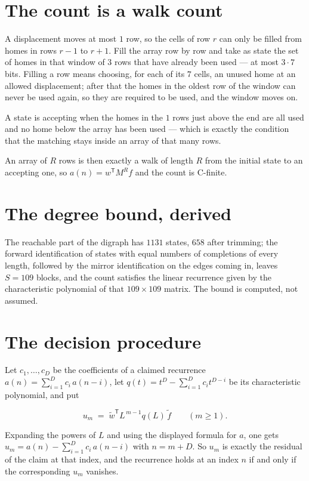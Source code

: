 \documentclass[11pt]{article}
\theoremstyle{definition}
\begin{document}
\section{The count is a walk count}

A displacement moves at most $1$ row, so the cells of row $r$ can only be filled from homes in rows $r-1$ to $r+1$. Fill the array row by row and take as state the set of homes in that window of $3$ rows that have already been used --- at most $3\cdot7$ bits. Filling a row means choosing, for each of its $7$ cells, an unused home at an allowed displacement; after that the homes in the oldest row of the window can never be used again, so they are required to be used, and the window moves on.

A state is accepting when the homes in the $1$ rows just above the end are all used and no home below the array has been used --- which is exactly the condition that the matching stays inside an array of that many rows.

An array of $R$ rows is then exactly a walk of length $R$ from the initial state to an accepting one, so $a(n) = w^{\mathsf T}M^{R}f$ and the count is C-finite.

\section{The degree bound, derived}

The reachable part of the digraph has $1131$ states, $658$ after trimming; the forward identification of states with equal numbers of completions of every length, followed by the mirror identification on the edges coming in, leaves $S = 109$ blocks, and the count satisfies the linear recurrence given by the characteristic polynomial of that $109\times109$ matrix. The bound is computed, not assumed.

\section{The decision procedure}

Let $c_1,\dots,c_D$ be the coefficients of a claimed recurrence $a(n) = \sum_{i=1}^{D} c_i\,a(n-i)$, let $q(t) = t^{D} - \sum_{i=1}^{D} c_i t^{D-i}$ be its characteristic polynomial, and put

\[u_m \;=\; \tilde w^{\mathsf T} L^{\,m-1} q(L)\,\tilde f \qquad (m \ge 1).\]

Expanding the powers of $L$ and using the displayed formula for $a$, one gets $u_m = a(n) - \sum_{i=1}^{D} c_i\,a(n-i)$ with $n = m + D$. So $u_m$ is exactly the residual of the claim at that index, and the recurrence holds at an index $n$ if and only if the corresponding $u_m$ vanishes.
\end{document}
